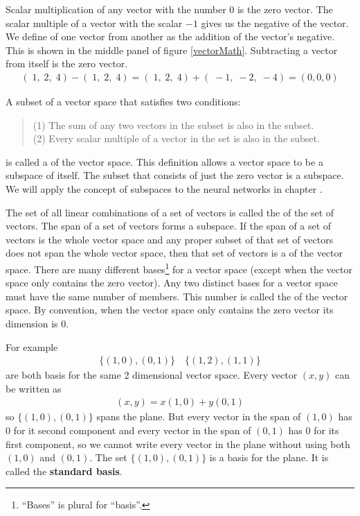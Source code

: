    Scalar multiplication of any vector with the number $0$ is the zero vector.
The scalar multiple of a vector with the scalar $-1$ gives us the negative
of the vector. We define  of one vector from 
another as the addition of the vector's negative. This is shown in the 
middle panel of figure \ref{vectorMath}. Subtracting a vector from itself is 
the zero vector.
\begin{eqnarray*}
  (\; 1, \; 2, \; 4) - (\; 1, \; 2, \; 4) = 
  (\; 1, \; 2, \; 4) + (\; -1, \; -2, \; -4) = (0,0,0)
\end{eqnarray*}

   A subset of a vector space that satisfies two conditions:
\begin{quote}
(1) The sum of any two vectors in the subset is also in the subset.   \\
(2) Every scalar multiple of a vector in the set is also in the subset. 
\end{quote}
is called a  of the vector space. This definition allows a 
vector space to be a subspace of itself. The subset that consists of just the
zero vector is a subspace. We will apply the concept of subspaces to the 
neural networks in chapter . 

   The set of all linear combinations of a set of vectors is called the 
 of the set of vectors. The span of a set of vectors forms a 
subspace. If the span of a set of vectors is the whole vector space and any
proper subset of that set of vectors does not span the whole vector space, then 
that set of vectors is a  of the vector space. There are
many different bases\footnote{``Bases'' is plural for ``basis''.} for a vector 
space (except when the vector space only contains the zero vector). Any
two distinct bases for a vector space must have the same number of members. 
This number is called the  of the vector space. By
convention, when the vector space only contains the zero vector its dimension 
is $0$.

   For example
\begin{eqnarray*}
\{ (1,0), (0,1) \} \quad \{ (1,2), (1,1) \}
\end{eqnarray*}
are both basis for the same 2 dimensional vector space. Every vector $(x,y)$
can be written as
\begin{eqnarray*}
(x,y) = x(1,0)+y(0,1)
\end{eqnarray*}  
so $\{ (1,0), (0,1) \}$ spans the plane. But every vector in the span of
$(1,0)$ has $0$ for it second component and every vector in the span of $(0,1)$
has $0$ for its first component, so we cannot write every vector in the plane 
without using both $(1,0)$ and $(0,1)$. The set $\{ (1,0), (0,1) \}$ is a basis for the plane. It is called the {\bf standard basis}. 

